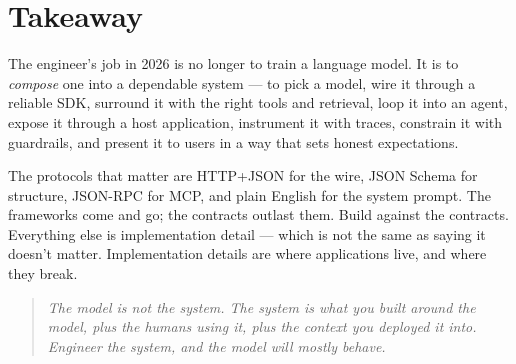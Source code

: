 \section{Takeaway}

The engineer's job in 2026 is no longer to train a language
model. It is to \emph{compose} one into a dependable system ---
to pick a model, wire it through a reliable SDK, surround it
with the right tools and retrieval, loop it into an agent,
expose it through a host application, instrument it with traces,
constrain it with guardrails, and present it to users in a way
that sets honest expectations.

The protocols that matter are HTTP+JSON for the wire, JSON
Schema for structure, JSON-RPC for MCP, and plain English for
the system prompt. The frameworks come and go; the contracts
outlast them. Build against the contracts. Everything else is
implementation detail --- which is not the same as saying it
doesn't matter. Implementation details are where applications
live, and where they break.

\begin{quote}
  \itshape The model is not the system. The system is what you
  built around the model, plus the humans using it, plus the
  context you deployed it into. Engineer the system, and the
  model will mostly behave.
\end{quote}
